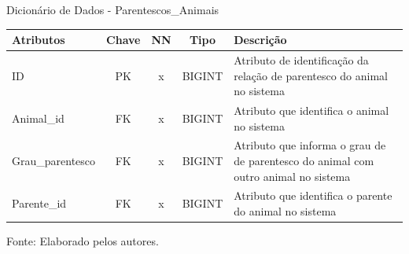 \documentclass[
    12pt,               %
    openright,          %
    oneside,
    a4paper,            %
    BIBLATEX,           %
    TODO,               %
    english,            %
    brazil              %
    ]{ifsp-spo-inf-ctds}
\begin{document}
    \begin{center}
        \begin{quadro}[H]
        \centering
                \caption{Dicionário de Dados - Parentescos\_Animais}
                  \begin{tabulary}{1.0\textwidth}{|p{9em}|c|c|c|p{19em}|}
            \hline
            Atributos & Chave & NN & Tipo & Descrição\\
            \hline
            ID & PK & x & BIGINT & Atributo de identificação da relação de parentesco do animal no sistema \\
            \hline
            Animal\_id & FK & x & BIGINT & Atributo que identifica o animal no sistema\\
            \hline
            Grau\_parentesco & FK & x & BIGINT & Atributo que informa o grau de de parentesco do animal com outro animal no sistema\\
            \hline
            Parente\_id & FK & x & BIGINT & Atributo que identifica o parente do animal no sistema\\
            \hline
            \end{tabulary}
                 
                \label{qd: md-parentesco-animal}
                \centering
        {\footnotesize Fonte: Elaborado pelos autores.}
              \end{quadro}
            \end{center}    
            
\end{document}
